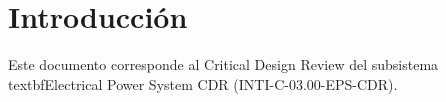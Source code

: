 \section{Introducción}
Este documento corresponde al Critical Design Review del subsistema \\textbf{Electrical Power System CDR} (INTI-C-03.00-EPS-CDR).

